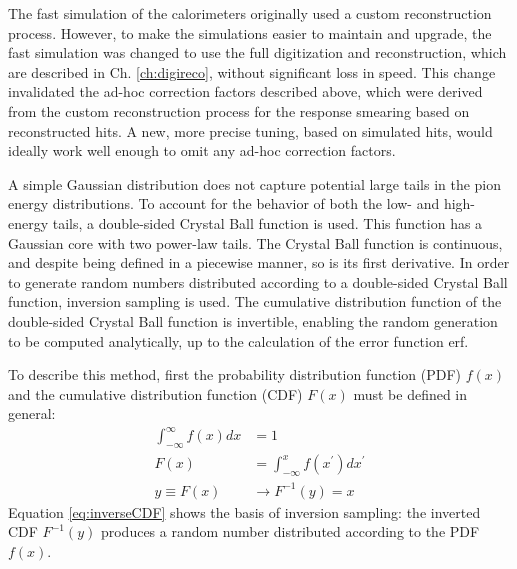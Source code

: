 The fast simulation of the calorimeters originally used a custom reconstruction process. However, to make the simulations easier to maintain and upgrade, the fast simulation was changed to use the full digitization and reconstruction, which are described in Ch. \ref{ch:digireco}, without significant loss in speed. This change invalidated the ad-hoc correction factors described above, which were derived from the custom reconstruction process for the response smearing based on reconstructed hits. A new, more precise tuning, based on simulated hits, would ideally work well enough to omit any ad-hoc correction factors.

A simple Gaussian distribution does not capture potential large tails in the pion energy distributions. To account for the behavior of both the low- and high-energy tails, a double-sided Crystal Ball function is used. This function has a Gaussian core with two power-law tails. The Crystal Ball function is continuous, and despite being defined in a piecewise manner, so is its first derivative. In order to generate random numbers distributed according to a double-sided Crystal Ball function, inversion sampling is used. The cumulative distribution function of the double-sided Crystal Ball function is invertible, enabling the random generation to be computed analytically, up to the calculation of the error function erf.

To describe this method, first the probability distribution function (PDF) $f(x)$ and the cumulative distribution function (CDF) $F(x)$ must be defined in general:
\begin{align}
\int_{-\infty}^{\infty} f(x)dx &= 1 \\
F(x) &= \int_{-\infty}^{x} f(x^{\prime})dx^{\prime} \label{eq:generalCDF} \\
y \equiv F(x) &\rightarrow F^{-1}(y) = x \label{eq:inverseCDF}
\end{align}
Equation \eqref{eq:inverseCDF} shows the basis of inversion sampling: the inverted CDF $F^{-1}(y)$ produces a random number distributed according to the PDF $f(x)$.

